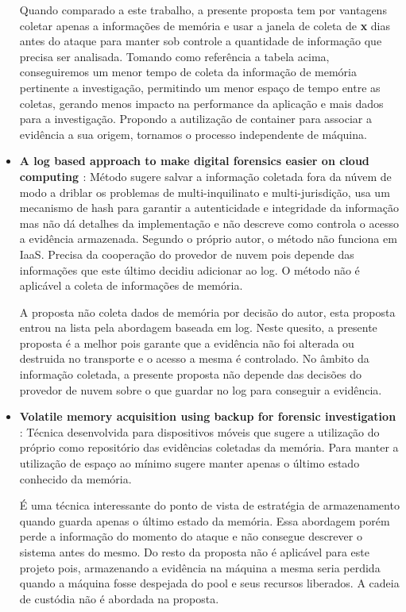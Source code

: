 \documentclass[
	12pt,				%
	openright,			%
	oneside,			%
	a4paper,			%
	english,			%
	french,				%
	spanish,			%
	brazil,				%
	]{abntex2}
\begin{document}
\begin{itemize}
Quando comparado a este trabalho, a presente proposta tem por vantagens coletar apenas a informações de memória e usar a janela de coleta de \textbf{x} dias antes do ataque para 
manter sob controle a quantidade de informação que precisa ser analisada. Tomando como referência a tabela acima, conseguiremos um menor tempo de coleta da informação de 
memória pertinente a investigação, permitindo um menor espaço de tempo entre as coletas, gerando menos impacto na performance da aplicação e mais dados para a investigação.
Propondo a autilização de container para associar a evidência a sua origem, tornamos o processo independente de máquina. \\
 
\item \textbf{A log based approach to make digital forensics easier on cloud computing \cite{Sang2013} }: Método sugere salvar a informação coletada fora da núvem de modo 
a driblar os problemas de multi-inquilinato e multi-jurisdição, usa um mecanismo de hash para garantir a autenticidade e integridade da informação mas não dá detalhes da 
implementação e não descreve como controla o acesso a evidência armazenada. Segundo o próprio autor, o método não funciona em IaaS. Precisa da cooperação do provedor de 
nuvem pois depende das informações que este último decidiu adicionar ao log. O método não é aplicável a coleta de informações de memória.

A proposta não coleta dados de memória por decisão do autor, esta proposta entrou na lista pela abordagem baseada em log. Neste quesito, a presente proposta é a melhor pois 
garante que a evidência não foi alterada ou destruida no transporte e o acesso a mesma é controlado. No âmbito da informação coletada, a presente proposta não depende das 
decisões do provedor de nuvem sobre o que guardar no log para conseguir a evidência. \\

\item \textbf{Volatile memory acquisition using backup for forensic investigation \cite{Dezfouli2012} }: Técnica desenvolvida para dispositivos móveis que sugere a utilização
do próprio como repositório das evidências coletadas da memória. Para manter a utilização de espaço ao mínimo sugere manter apenas o último estado conhecido da memória.
 
É uma técnica interessante do ponto de vista de estratégia de armazenamento quando guarda apenas o último estado da memória. Essa abordagem porém perde a informação do momento 
do ataque e não consegue descrever o sistema antes do mesmo. Do resto da proposta não é aplicável para este projeto pois, armazenando a evidência na máquina a mesma seria perdida
quando a máquina fosse despejada do pool e seus recursos liberados. A cadeia de custódia não é abordada na proposta.\\


\end{itemize}
\end{document}

